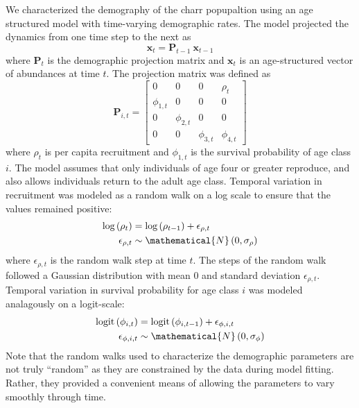We characterized the demography of the charr popupaltion using an age structured model
with time-varying demographic rates.
The model projected the dynamics from one time step to the next as
%
\begin{equation} \label{eq:XPX}
    \mathbf{x}_t = \mathbf{P}_{t-1}~\mathbf{x}_{t-1}
\end{equation}
%
where $\mathbf{P}_{t}$ is the demographic projection matrix
and $\mathbf{x}_t$ is an age-structured vector of abundances at time $t$.
%
The projection matrix was defined as
%
\begin{equation} \label{eq:matrix}
\mathbf{P}_{i,t} = 
\left[
\begin{array}{cccccccc}
    0             & 0             & 0             & \rho_{t}     \\
    \phi_{1,t}    & 0             & 0             & 0            \\
    0             & \phi_{2,t}    & 0             & 0            \\
    0             & 0             & \phi_{3,t}    & \phi_{4,t}
    \end{array}
\right]
\end{equation}
%
where $\rho_{t}$ is per capita recruitment and $\phi_{1,t}$ is the survival probability
of age class $i$. 
The model assumes that only individuals of age four or greater reproduce,
and also allows individuals return to the adult age class.
%
Temporal variation in recruitment was modeled as a random walk on a log scale to ensure
that the values remained positive:
%
\begin{equation} \label{eq:rho}
\begin{aligned}
\text{log}\left(\rho_t\right) &= \text{log}\left(\rho_{t - 1}\right) + \epsilon_{\rho,t} \\
\epsilon_{\rho,t} &\sim \mathematical{N}\left(0, \sigma_{\rho} \right)
\end{aligned}
\end{equation}
%
where $\epsilon_{\rho,t}$ is the random walk step at time $t$.
The steps of the random walk followed a Gaussian distribution with mean 0 
and standard deviation $\epsilon_{\rho,t}$.
Temporal variation in survival probability for age class $i$ was modeled analagously 
on a logit-scale:
%
\begin{equation} \label{eq:phi}
\begin{aligned}
\text{logit}\left(\phi_{i, t}\right) &= \text{logit}\left(\phi_{i, t - 1}\right) +
                                          \epsilon_{\phi,i,t} \\
\epsilon_{\phi,i,t} &\sim \mathematical{N}\left(0, \sigma_{\phi} \right)
\end{aligned}
\end{equation}
%
Note that the random walks used to characterize the demographic parameters 
are not truly ``random'' as they are constrained by the data during model fitting.
Rather, they provided a convenient means 
of allowing the parameters to vary smoothly through time.

